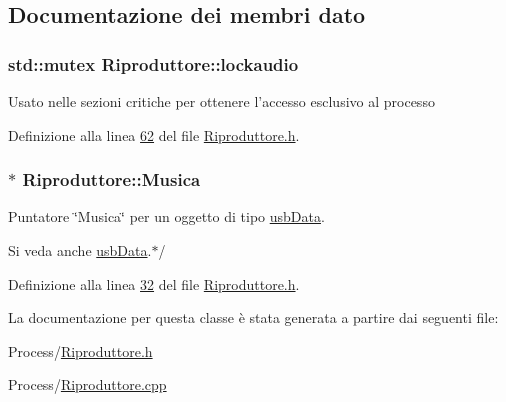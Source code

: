 \subsection{\-Documentazione dei membri dato}
\hypertarget{classRiproduttore_a514d48c11b89c737c8e266e1ca3415f1}{
\subsubsection[{lockaudio}]{\setlength{\rightskip}{0pt plus 5cm}std\-::mutex {\bf \-Riproduttore\-::lockaudio}}}\label{classRiproduttore_a514d48c11b89c737c8e266e1ca3415f1}
\-Usato nelle sezioni critiche per ottenere l'accesso esclusivo al processo 

\-Definizione alla linea \hyperlink{Riproduttore_8h_source_l00062}{62} del file \hyperlink{Riproduttore_8h_source}{\-Riproduttore.\-h}.

\hypertarget{classRiproduttore_a373b2d6675abc22dbe61abf2223cacab}{
\subsubsection[{\-Musica}]{$\ast$ {\bf \-Riproduttore\-::\-Musica}}}\label{classRiproduttore_a373b2d6675abc22dbe61abf2223cacab}


\-Puntatore \char`\"{}\-Musica\char`\"{} per un oggetto di tipo \hyperlink{classusbData}{usb\-Data}. 

\begin{DoxySeeAlso}{\-Si veda anche}
\hyperlink{classusbData}{usb\-Data}.$\ast$/ 
\end{DoxySeeAlso}


\-Definizione alla linea \hyperlink{Riproduttore_8h_source_l00032}{32} del file \hyperlink{Riproduttore_8h_source}{\-Riproduttore.\-h}.



\-La documentazione per questa classe è stata generata a partire dai seguenti file\-:\begin{DoxyCompactItemize}
\item 
\-Process/\hyperlink{Riproduttore_8h}{\-Riproduttore.\-h}\item 
\-Process/\hyperlink{Riproduttore_8cpp}{\-Riproduttore.\-cpp}\end{DoxyCompactItemize}
